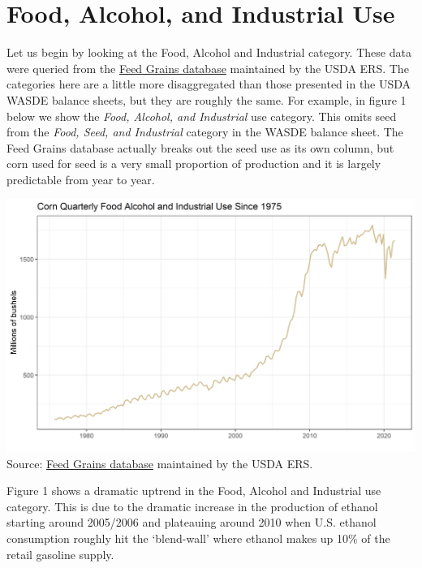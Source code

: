 \documentclass[
]{book}
\begin{document}
\hypertarget{food-alcohol-and-industrial-use}{%
\section{Food, Alcohol, and Industrial Use}\label{food-alcohol-and-industrial-use}}

Let us begin by looking at the Food, Alcohol and Industrial category.
These data were queried from the \href{http://www.ers.usda.gov/data-products/feed-grains-database/feed-grains-yearbook-tables.aspx\#26780}{Feed Grains
database}
maintained by the USDA ERS. The categories here are a little more
disaggregated than those presented in the USDA WASDE balance sheets, but
they are roughly the same. For example, in figure 1 below we show the
\emph{Food, Alcohol, and Industrial} use category. This omits seed from the
\emph{Food, Seed, and Industrial} category in the WASDE balance sheet. The
Feed Grains database actually breaks out the seed use as its own column,
but corn used for seed is a very small proportion of production and it
is largely predictable from year to year.

\includegraphics{assets/ForecastingUseof-CornUseCategoriesFoodAlcoholInd.png} Source:
\href{http://www.ers.usda.gov/data-products/feed-grains-database/feed-grains-yearbook-tables.aspx\#26780}{Feed Grains
database}
maintained by the USDA ERS.

Figure 1 shows a dramatic uptrend in the Food, Alcohol and Industrial
use category. This is due to the dramatic increase in the production of
ethanol starting around 2005/2006 and plateauing around 2010 when U.S.
ethanol consumption roughly hit the `blend-wall' where ethanol makes up
10\% of the retail gasoline supply.
\end{document}

